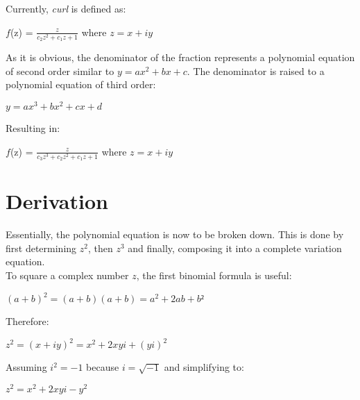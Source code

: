 \documentclass[]{article}
\begin{document}
\noindent Currently, \emph{curl} is defined as:

\begin{flushleft}
	\hspace{20pt} $f$(z) = $\frac{z}{c_2z^2 + c_1z + 1}$ where $z = x + iy$
\end{flushleft}

\noindent As it is obvious, the denominator of the fraction represents a polynomial equation of second order similar to $y = ax^2 + bx + c$. The denominator is raised to a polynomial equation of third order: 

\begin{flushleft}
	\hspace{20pt} $y = ax^3 + bx^2 + cx + d$\\
\end{flushleft}

\noindent Resulting in:

\begin{flushleft}
	\hspace{20pt} $f$(z) = $\frac{z}{c_3z^3 + c_2z^2 + c_1z + 1}$ where $z = x + iy$
\end{flushleft}

\section{Derivation}

Essentially, the polynomial equation is now to be broken down. This is done by first determining $z^2$, then $z^3$ and finally, composing it into a complete variation equation. \\

\noindent To square a complex number $z$, the first binomial formula is useful:

\begin{flushleft}
	\hspace{20pt} $(a + b)^2 = (a + b)(a + b) = a^2 + 2ab + b²$
\end{flushleft}

\noindent Therefore:

\begin{flushleft}
	\hspace{20pt} $z^2 = (x + iy)^2 = x^2 + 2xyi + (yi)^2$
\end{flushleft}

\noindent Assuming $i^2 = -1$ because $i = \sqrt{-1}$ and simplifying to:

\begin{flushleft}
	\hspace{20pt} $z^2 = x^2 + 2xyi - y^2 $
\end{flushleft}
\end{document}
